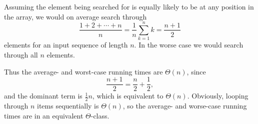 
Assuming the element being searched for is equally likely to be at any position in 
the array, we would on average search through
\[
    \frac{1 + 2 + \cdots + n}{n}  = \frac{1}{n}\sum_{k=1}^nk = \frac{n + 1}{2}
\]
elements for an input sequence of length $n$. In the worse case we would search through
all $n$ elements.

Thus the average- and worst-case running times are $\Theta(n)$, since
\[
    \frac{n + 1}{2} = \frac{n}{2} + \frac{1}{2},
\]
and the dominant term is $\frac{1}{2}n$, which is equivalent to $\Theta(n)$. Obviously,
looping through $n$ items sequentially is $\Theta(n)$, so the average- and worse-case
running times are in an equivalent $\Theta$-class.
